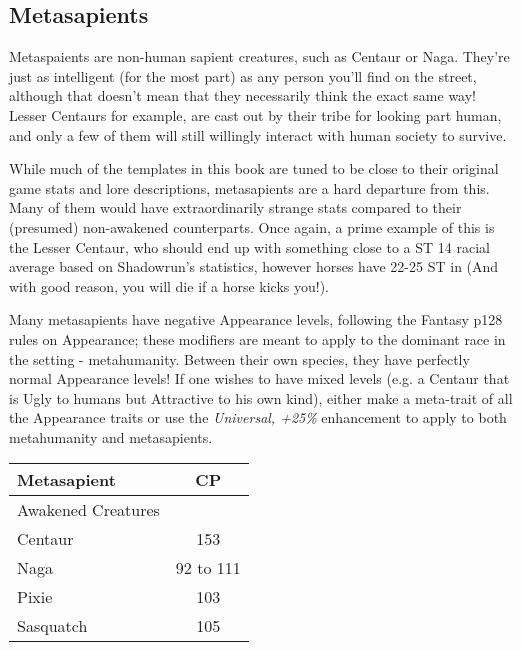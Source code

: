 \begin{multicols*}{3}
	\subsection{Metasapients}
	
	Metaspaients are non-human sapient creatures, such as Centaur or Naga. They're just as intelligent (for the most part) as any person you'll find on the street, although that doesn't mean that they necessarily think the exact same way! Lesser Centaurs for example, are cast out by their tribe for looking part human, and only a few of them will still willingly interact with human society to survive.
	
	While much of the templates in this book are tuned to be close to their original game stats and lore descriptions, metasapients are a hard departure from this. Many of them would have extraordinarily strange stats compared to their (presumed) non-awakened counterparts. Once again, a prime example of this is the Lesser Centaur, who should end up with something close to a ST 14 racial average based on Shadowrun's statistics, however horses have 22-25 ST in \GURPS (And with good reason, you will die if a horse kicks you!).
	
	Many metasapients have negative Appearance levels, following the Fantasy p128  rules on Appearance; these modifiers are meant to apply to the dominant race in the setting - metahumanity. Between their own species, they have perfectly normal Appearance levels! If one wishes to have mixed levels (e.g. a Centaur that is Ugly to humans but Attractive to his own kind), either make a meta-trait of all the Appearance traits or use the \textit{Universal, +25\%} enhancement to apply to both metahumanity and metasapients.
	
	\begin{center}
		\begin{tabularx}{0.32\textwidth}{|X|c|}
			\hline
			Metasapient & CP \\
			\hline
			\hline
			Awakened Creatures & \\
			\hline
			Centaur & 153 \\
			Naga & 92 to 111 \\
			Pixie & 103 \\
			Sasquatch & 105 \\
			\hline
		\end{tabularx}
	\end{center}
	

\end{multicols*}

